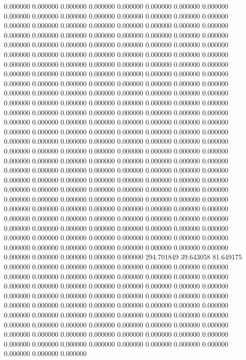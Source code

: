 0.000000 0.000000 0.000000
0.000000 0.000000 0.000000
0.000000 0.000000 0.000000
0.000000 0.000000 0.000000
0.000000 0.000000 0.000000
0.000000 0.000000 0.000000
0.000000 0.000000 0.000000
0.000000 0.000000 0.000000
0.000000 0.000000 0.000000
0.000000 0.000000 0.000000
0.000000 0.000000 0.000000
0.000000 0.000000 0.000000
0.000000 0.000000 0.000000
0.000000 0.000000 0.000000
0.000000 0.000000 0.000000
0.000000 0.000000 0.000000
0.000000 0.000000 0.000000
0.000000 0.000000 0.000000
0.000000 0.000000 0.000000
0.000000 0.000000 0.000000
0.000000 0.000000 0.000000
0.000000 0.000000 0.000000
0.000000 0.000000 0.000000
0.000000 0.000000 0.000000
0.000000 0.000000 0.000000
0.000000 0.000000 0.000000
0.000000 0.000000 0.000000
0.000000 0.000000 0.000000
0.000000 0.000000 0.000000
0.000000 0.000000 0.000000
0.000000 0.000000 0.000000
0.000000 0.000000 0.000000
0.000000 0.000000 0.000000
0.000000 0.000000 0.000000
0.000000 0.000000 0.000000
0.000000 0.000000 0.000000
0.000000 0.000000 0.000000
0.000000 0.000000 0.000000
0.000000 0.000000 0.000000
0.000000 0.000000 0.000000
0.000000 0.000000 0.000000
0.000000 0.000000 0.000000
0.000000 0.000000 0.000000
0.000000 0.000000 0.000000
0.000000 0.000000 0.000000
0.000000 0.000000 0.000000
0.000000 0.000000 0.000000
0.000000 0.000000 0.000000
0.000000 0.000000 0.000000
0.000000 0.000000 0.000000
0.000000 0.000000 0.000000
0.000000 0.000000 0.000000
0.000000 0.000000 0.000000
0.000000 0.000000 0.000000
0.000000 0.000000 0.000000
0.000000 0.000000 0.000000
0.000000 0.000000 0.000000
0.000000 0.000000 0.000000
0.000000 0.000000 0.000000
0.000000 0.000000 0.000000
0.000000 0.000000 0.000000
0.000000 0.000000 0.000000
0.000000 0.000000 0.000000
0.000000 0.000000 0.000000
0.000000 0.000000 0.000000
0.000000 0.000000 0.000000
0.000000 0.000000 0.000000
0.000000 0.000000 0.000000
0.000000 0.000000 0.000000
0.000000 0.000000 0.000000
0.000000 0.000000 0.000000
294.701849 39.643058 81.649175
0.000000 0.000000 0.000000
0.000000 0.000000 0.000000
0.000000 0.000000 0.000000
0.000000 0.000000 0.000000
0.000000 0.000000 0.000000
0.000000 0.000000 0.000000
0.000000 0.000000 0.000000
0.000000 0.000000 0.000000
0.000000 0.000000 0.000000
0.000000 0.000000 0.000000
0.000000 0.000000 0.000000
0.000000 0.000000 0.000000
0.000000 0.000000 0.000000
0.000000 0.000000 0.000000
0.000000 0.000000 0.000000
0.000000 0.000000 0.000000
0.000000 0.000000 0.000000
0.000000 0.000000 0.000000
0.000000 0.000000 0.000000
0.000000 0.000000 0.000000
0.000000 0.000000 0.000000
0.000000 0.000000 0.000000
0.000000 0.000000 0.000000
0.000000 0.000000 0.000000
0.000000 0.000000 0.000000
